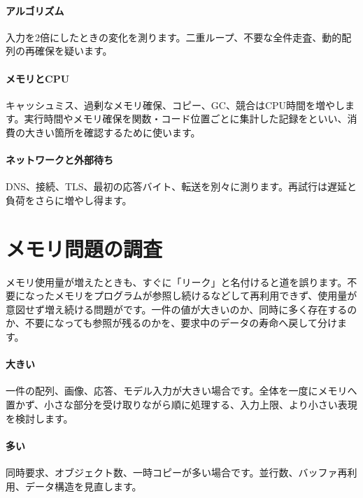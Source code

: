 \paragraph{アルゴリズム}
        入力を2倍にしたときの変化を測ります。二重ループ、不要な全件走査、動的配列の再確保を疑います。

\par
\endgroup
\medskip
\begingroup
\paragraph{メモリとCPU}
        キャッシュミス、過剰なメモリ確保、コピー、GC、競合はCPU時間を増やします。実行時間やメモリ確保を関数・コード位置ごとに集計した記録をといい、消費の大きい箇所を確認するために使います。

\paragraph{ネットワークと外部待ち}
        DNS、接続、TLS、最初の応答バイト、転送を別々に測ります。再試行は遅延と負荷をさらに増やし得ます。

\par
\endgroup
\par
\endgroup


\section{メモリ問題の調査}
\label{sec:07-practice-09}

メモリ使用量が増えたときも、すぐに「リーク」と名付けると道を誤ります。不要になったメモリをプログラムが参照し続けるなどして再利用できず、使用量が意図せず増え続ける問題がです。一件の値が大きいのか、同時に多く存在するのか、不要になっても参照が残るのかを、要求中のデータの寿命へ戻して分けます。

\begingroup
\begingroup
\paragraph{大きい}
        一件の配列、画像、応答、モデル入力が大きい場合です。全体を一度にメモリへ置かず、小さな部分を受け取りながら順に処理する、入力上限、より小さい表現を検討します。

\par
\endgroup
\medskip
\begingroup
\paragraph{多い}
        同時要求、オブジェクト数、一時コピーが多い場合です。並行数、バッファ再利用、データ構造を見直します。

